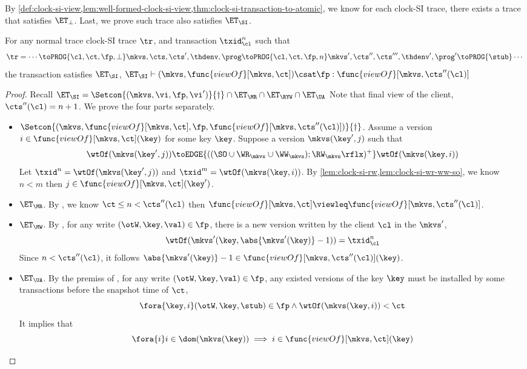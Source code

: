 By \cref{def:clock-si-view,lem:well-formed-clock-si-view,thm:clock-si-transaction-to-atomic},
we know for each clock-SI trace, there exists a trace that satisfies \( \ET_\perp \).
Last, we prove such trace also satisfies \( \ET_\SI \).
\begin{theorem}
    For any normal trace clock-SI trace \( \tr \), and transaction \( \txid_\cl^{n} \) such that
    \[
        \tr = \cdots \toPROG{\cl, \ct, \fp, \perp} \mkvs, \cts, \cts', \thdenv, \prog  \toPROG{\cl, \ct, \fp, n} \mkvs', \cts'', \cts''', \thdenv', \prog' \toPROG{\stub} \cdots
    \]
    the transaction satisfies \( \ET_\SI \), \ie \( \ET_\SI \vdash (\mkvs, \func{viewOf}[\mkvs,\ct]) \csat \fp : \func{viewOf}[\mkvs,\cts''(\cl)] \)
\end{theorem}
\begin{proof}
    Recall \( \ET_\SI  = \Setcon{(\mkvs, \vi, \fp, \vi')}{\dagger} \cap \ET_\MR \cap \ET_\RYW  \cap \ET_\UA \)
    Note that final view of the client, \( \cts''(\cl) = n + 1 \).
    We prove the four parts separately.
    \begin{itemize}
        \item \( \Setcon{(\mkvs, \func{viewOf}[\mkvs,\ct], \fp, \func{viewOf}[\mkvs,\cts''(\cl)])}{\dagger} \).
            Assume a version \( i \in \func{viewOf}[\mkvs,\ct](\key) \) for some key \( \key \).
            Suppose a version \( \mkvs(\key',j)\) such that 
            \[ 
                \wtOf(\mkvs(\key',j)) \toEDGE{((\SO \cup \WR_{\mkvs} \cup \WW_{\mkvs}) ; \RW_{\mkvs}\rflx)^+} \wtOf(\mkvs(\key,i))
            \]
            Let \( \txid^n = \wtOf(\mkvs(\key',j)) \) and \( \txid^m = \wtOf(\mkvs(\key,i)) \).
            By \cref{lem:clock-si-rw,lem:clock-si-wr-ww-so}, we know \( n < m \) then \( j  \in \func{viewOf}[\mkvs,\ct](\key')\).
        \item \( \ET_\MR \).
            By , we know \( \ct \leq n < \cts''(\cl) \) then \( \func{viewOf}[\mkvs,\ct] \viewleq \func{viewOf}[\mkvs,\cts''(\cl)] \).
        \item \( \ET_\MW \).
            By , for any write \( (\otW, \key, \val) \in \fp \), there is a new version written by the client \( \cl \) in the \( \mkvs'  \),
            \[
                \wtOf(\mkvs'(\key,\abs{\mkvs'(\key)} - 1)) = \txid_\cl^{n}
            \]
            Since \( n < \cts''(\cl)\), it follows \( \abs{\mkvs'(\key)} - 1 \in \func{viewOf}[\mkvs,\cts''(\cl)](\key) \).
        \item \( \ET_\UA \).
            By the premiss of , for any write \( (\otW, \key, \val) \in \fp \), any existed versions of the key \( \key \)
            must be installed by some transactions before the snapshot time of \( \ct \),
            \[
                \fora{\key,i} (\otW, \key, \stub) \in \fp \land \wtOf(\mkvs(\key,i)) < \ct 
            \]
            It implies that 
            \[ 
                \fora{i} i \in \dom(\mkvs(\key)) \implies i \in \func{viewOf}[\mkvs,\ct](\key) 
            \]
    \end{itemize}
\end{proof}

